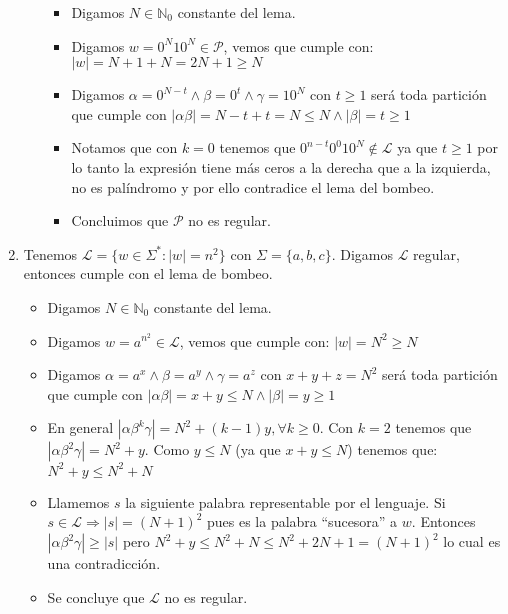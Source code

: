 \documentclass[spanish, fleqn]{article}
\begin{document}
\begin{enumerate}
\begin{enumerate}
\begin{itemize}
						\item
							Digamos $N \in \mathbb{N}_{0}$ constante del lema.
						\item
							Digamos $w = 0^{N}10^{N} \in \mathcal{P}$, vemos 
							que cumple con: $|w| = N + 1 + N = 2N+1 \geq N$
						\item
							Digamos $\alpha = 0^{N-t} \land \beta = 0^{t} \land
							\gamma = 10^{N}$ con $t \geq 1$ será toda partición
							que cumple con $|\alpha\beta| = N - t + t = N \leq 
							N \land |\beta| = t \geq 1$
						\item
							Notamos que con $k = 0$ tenemos que 
							$0^{n-t}0^{0}10^{N} \notin \mathcal{L}$ ya que $t
							\geq 1$ por lo tanto la expresión tiene más ceros a
							la derecha que a la izquierda, no es palíndromo y
							por ello contradice el lema del bombeo.
						\item
							Concluimos que $\mathcal{P}$ no es regular.
					\end{itemize}
			\end{enumerate}

        \item 
			Tenemos $\mathcal{L} = \{w \in \Sigma^{*}: |w|=n^{2}\}$ con
			$\Sigma = \{a,b,c\}$. Digamos $\mathcal{L}$ regular, entonces 
			cumple con el lema de bombeo.
			\begin{itemize}
				\item
					Digamos $N \in \mathbb{N}_{0}$ constante del lema.
				\item
					Digamos $w = a^{n^{2}} \in \mathcal{L}$, vemos que cumple
					con: $|w| = N^{2} \geq N$
				\item
					Digamos $\alpha = a^{x} \land \beta = a^{y} \land \gamma = 
					a^{z}$ con $x+y+z = N^{2}$ será toda partición que cumple
					con $|\alpha\beta| = x + y \leq N \land |\beta| = y \geq 1$
				\item
					En general $|\alpha\beta^{k}\gamma| = N^{2} + (k-1)y,
					\forall k \geq 0$. Con $k=2$ tenemos que $|\alpha\beta^{2}
					\gamma| = N^{2} + y$.
					Como $y \leq N$ (ya que $x+y \leq N$) tenemos que:
					$N^{2} +y \leq N^{2} + N$
				\item
					Llamemos $s$ la siguiente palabra representable por el
					lenguaje. Si $s \in \mathcal{L} \Rightarrow |s| = (N+1)^2$
					pues es la palabra ``sucesora'' a $w$. Entonces $|\alpha
					\beta^{2}\gamma| \geq |s|$ pero $N^{2} + y \leq N^{2} + N
					\leq N^{2} + 2N + 1 = (N+1)^{2}$ lo cual es una 
					contradicción.
				\item
					Se concluye que $\mathcal{L}$ no es regular.
			\end{itemize}


\end{enumerate}
\end{document}
